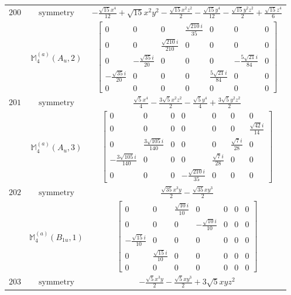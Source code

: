 \documentclass[fleqn,8pt,landscape]{jsarticle}
\begin{document}
\begin{longtable}{ccc}
$ 200 $ & $ \text{symmetry} $ & $ - \frac{\sqrt{15} x^{4}}{12} + \sqrt{15} x^{2} y^{2} - \frac{\sqrt{15} x^{2} z^{2}}{2} - \frac{\sqrt{15} y^{4}}{12} - \frac{\sqrt{15} y^{2} z^{2}}{2} + \frac{\sqrt{15} z^{4}}{6} $ \\
$  $ & $ \mathbb{M}_{4}^{(a)}(A_{u},2) $ & $ \begin{bmatrix} 0 & 0 & 0 & \frac{\sqrt{210} i}{35} & 0 & 0 & 0 \\ 0 & 0 & \frac{\sqrt{210} i}{210} & 0 & 0 & 0 & 0 \\ 0 & - \frac{\sqrt{35} i}{20} & 0 & 0 & 0 & - \frac{5 \sqrt{21} i}{84} & 0 \\ - \frac{\sqrt{35} i}{20} & 0 & 0 & 0 & \frac{5 \sqrt{21} i}{84} & 0 & 0 \\ 0 & 0 & 0 & 0 & 0 & 0 & 0 \end{bmatrix} $ \\ \hline
$ 201 $ & $ \text{symmetry} $ & $ \frac{\sqrt{5} x^{4}}{4} - \frac{3 \sqrt{5} x^{2} z^{2}}{2} - \frac{\sqrt{5} y^{4}}{4} + \frac{3 \sqrt{5} y^{2} z^{2}}{2} $ \\
$  $ & $ \mathbb{M}_{4}^{(a)}(A_{u},3) $ & $ \begin{bmatrix} 0 & 0 & 0 & 0 & 0 & 0 & 0 \\ 0 & 0 & 0 & 0 & 0 & 0 & \frac{\sqrt{42} i}{14} \\ 0 & \frac{3 \sqrt{105} i}{140} & 0 & 0 & 0 & \frac{\sqrt{7} i}{28} & 0 \\ - \frac{3 \sqrt{105} i}{140} & 0 & 0 & 0 & \frac{\sqrt{7} i}{28} & 0 & 0 \\ 0 & 0 & 0 & - \frac{\sqrt{210} i}{35} & 0 & 0 & 0 \end{bmatrix} $ \\ \hline
$ 202 $ & $ \text{symmetry} $ & $ \frac{\sqrt{35} x^{3} y}{2} - \frac{\sqrt{35} x y^{3}}{2} $ \\
$  $ & $ \mathbb{M}_{4}^{(a)}(B_{1u},1) $ & $ \begin{bmatrix} 0 & 0 & \frac{\sqrt{10} i}{10} & 0 & 0 & 0 & 0 \\ 0 & 0 & 0 & - \frac{\sqrt{10} i}{10} & 0 & 0 & 0 \\ - \frac{\sqrt{15} i}{10} & 0 & 0 & 0 & 0 & 0 & 0 \\ 0 & \frac{\sqrt{15} i}{10} & 0 & 0 & 0 & 0 & 0 \\ 0 & 0 & 0 & 0 & 0 & 0 & 0 \end{bmatrix} $ \\ \hline
$ 203 $ & $ \text{symmetry} $ & $ - \frac{\sqrt{5} x^{3} y}{2} - \frac{\sqrt{5} x y^{3}}{2} + 3 \sqrt{5} x y z^{2} $ \\

\end{longtable}
\end{document}
